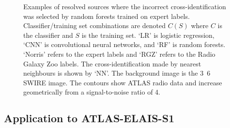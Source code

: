 \documentclass[fleqn,usenatbib,usedcolumn]{mnras}
\begin{document}
\begin{figure}
        \caption{\label{fig:examples} Examples of resolved sources where the incorrect cross-identification was selected by random forests trained on expert labels. Classifier/training set combinations are denoted $C(S)$ where $C$ is the classifier and $S$ is the training set. `LR' is logistic regression, `CNN' is convolutional neural networks, and `RF' is random forests. `Norris' refers to the expert labels and `RGZ' refers to the Radio Galaxy Zoo labels. The cross-identification made by nearest neighbours is shown by `NN'. The background image is the \unit{3.6}{\micro\meter} SWIRE image. The contours show ATLAS radio data and increase geometrically from a signal-to-noise ratio of 4.}
    \end{figure}

\subsection{Application to ATLAS-ELAIS-S1}
  \label{sec:elais}
\end{document}
